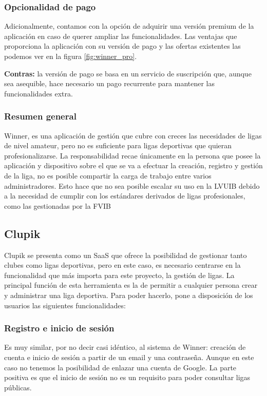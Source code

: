 \subsubsection*{Opcionalidad de pago}

Adicionalmente, contamos con la opción de adquirir una versión premium de la aplicación en caso de querer ampliar las funcionalidades. Las ventajas que proporciona la aplicación con su versión de pago y las ofertas existentes las podemos ver en la figura \ref{fig:winner_pro}.

\textbf{Contras:} la versión de pago se basa en un servicio de suscripción que, aunque sea asequible, hace necesario un pago recurrente para mantener las funcionalidades extra.

\subsubsection*{Resumen general}
Winner, es una aplicación de gestión que cubre con creces las necesidades de ligas de nivel amateur, pero no es suficiente para ligas deportivas que quieran profesionalizarse. La responsabilidad recae únicamente en la persona que posee la aplicación y dispositivo sobre el que se va a efectuar la creación, registro y gestión de la liga, no es posible compartir la carga de trabajo entre varios administradores. Esto hace que no sea posible escalar su uso en la \ac{LVUIB} debido a la necesidad de cumplir con los estándares derivados de ligas profesionales, como las gestionadas por la \ac{FVIB}

\subsection{Clupik}

Clupik se presenta como un \ac{SaaS} que ofrece la posibilidad de gestionar tanto clubes como ligas deportivas, pero en este caso, es necesario centrarse en la funcionalidad que más importa para este proyecto, la gestión de ligas. La principal función de esta herramienta es la de permitir a cualquier persona crear y administrar una liga deportiva. Para poder hacerlo, pone a disposición de los usuarios las siguientes funcionalidades:

\subsubsection*{Registro e inicio de sesión}

Es muy similar, por no decir casi idéntico, al sistema de Winner: creación de cuenta e inicio de sesión a partir de un email y una contraseña. Aunque en este caso no tenemos la posibilidad de enlazar una cuenta de Google. La parte positiva es que el inicio de sesión no es un requisito para poder consultar ligas públicas.

